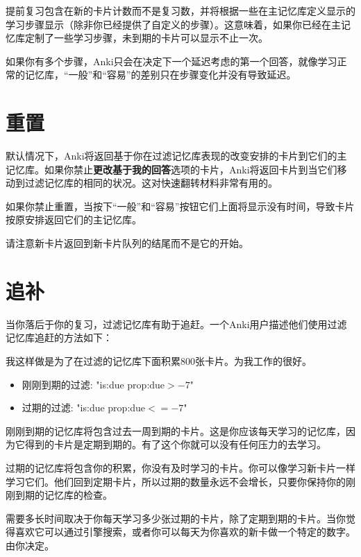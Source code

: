 \documentclass[a4paper]{book}
\begin{document}
			提前复习包含在新的卡片计数而不是复习数，并将根据一些在主记忆库定义显示的学习步骤显示（除非你已经提供了自定义的步骤）。这意味着，如果你已经在主记忆库定制了一些学习步骤，未到期的卡片可以显示不止一次。
			
			如果你有多个步骤，Anki只会在决定下一个延迟考虑的第一个回答，就像学习正常的记忆库，“一般”和“容易”的差别只在步骤变化并没有导致延迟。
			
			\section{重置}
			
			默认情况下，Anki将返回基于你在过滤记忆库表现的改变安排的卡片到它们的主记忆库。如果你禁止\textbf{更改基于我的回答}选项的卡片，Anki将返回卡片到当它们移动到过滤记忆库的相同的状况。这对快速翻转材料非常有用的。
			
			如果你禁止重置，当按下“一般”和“容易”按钮它们上面将显示没有时间，导致卡片按原安排返回它们的主记忆库。
			
			请注意新卡片返回到新卡片队列的结尾而不是它的开始。
			
			\section{追补}
			
			当你落后于你的复习，过滤记忆库有助于追赶。一个Anki用户描述他们使用过滤记忆库追赶的方法如下：
			
			我这样做是为了在过滤的记忆库下面积累800张卡片。为我工作的很好。
			
			\begin{fquote}
				\begin{itemize}
					\itemsep1pt\parskip0pt
					\item 刚刚到期的过滤: "is:due prop:due$>-7$"
					\item 过期的过滤: "is:due prop:due$<=-7$"
				\end{itemize}
				
				刚刚到期的记忆库将包含过去一周到期的卡片。这是你应该每天学习的记忆库，因为它得到的卡片是定期到期的。有了这个你就可以没有任何压力的去学习。
				
				过期的记忆库将包含你的积累，你没有及时学习的卡片。你可以像学习新卡片一样学习它们。他们回到定期卡片，所以过期的数量永远不会增长，只要你保持你的刚刚到期的记忆库的检查。
				
				需要多长时间取决于你每天学习多少张过期的卡片，除了定期到期的卡片。当你觉得喜欢它可以通过引擎搜索，或者你可以每天为你喜欢的新卡做一个特定的数字。由你决定。
			\end{fquote}
			
\end{document}
